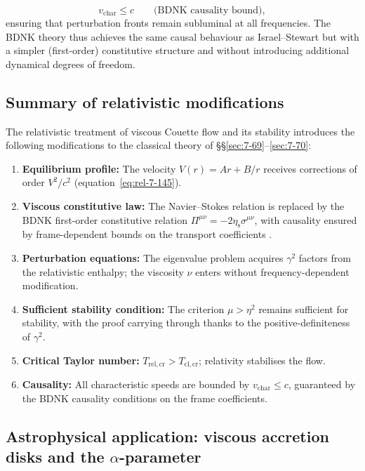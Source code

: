 \begin{equation}
\label{eq:rel-7-171}
v_{\mathrm{char}} \le c
\qquad\text{(BDNK causality bound)},
\end{equation}
ensuring that perturbation fronts remain subluminal at all
frequencies.  The BDNK theory thus achieves the same causal
behaviour as Israel--Stewart but with a simpler (first-order)
constitutive structure and without introducing additional dynamical
degrees of freedom.

\subsection{Summary of relativistic modifications}\label{sec:rel-7-70g}

The relativistic treatment of viscous Couette flow and its stability
introduces the following modifications to the classical theory of
\S\S\ref{sec:7-69}--\ref{sec:7-70}:

\begin{enumerate}
\item \textbf{Equilibrium profile:}  The velocity
  $V(r)=Ar+B/r$ receives corrections of order $V^{2}/c^{2}$
  (equation~\eqref{eq:rel-7-145}).
\item \textbf{Viscous constitutive law:}  The Navier--Stokes
  relation is replaced by the BDNK first-order constitutive
  relation $\Pi^{\mu\nu}=-2\eta_{\mathrm{s}}\sigma^{\mu\nu}$,
  with causality ensured by frame-dependent bounds on the
  transport coefficients \citep{BemficaDN2018,Kovtun2019}.
\item \textbf{Perturbation equations:}  The eigenvalue problem
  acquires $\gamma^{2}$ factors from the relativistic enthalpy;
  the viscosity $\nu$ enters without frequency-dependent modification.
\item \textbf{Sufficient stability condition:}  The criterion
  $\mu>\eta^{2}$ remains sufficient for stability, with the proof
  carrying through thanks to the positive-definiteness of
  $\gamma^{2}$.
\item \textbf{Critical Taylor number:}  $T_{\mathrm{rel,cr}}>
  T_{\mathrm{cl,cr}}$; relativity stabilises the flow.
\item \textbf{Causality:}  All characteristic speeds are
  bounded by $v_{\mathrm{char}}\le c$, guaranteed by the BDNK
  causality conditions on the frame coefficients.
\end{enumerate}

\subsection{Astrophysical application: viscous accretion disks and
  the $\alpha$-parameter}
\label{sec:rel-7-70-astro}

